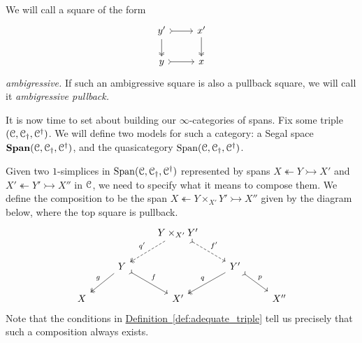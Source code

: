 \documentclass[main.tex]{subfiles}
\begin{document}
We will call a square of the form
\begin{equation*}
  \begin{tikzcd}
    y'
    \arrow[r, rightarrowtail]
    \arrow[d, two heads]
    & x'
    \arrow[d, two heads]
    \\
    y
    \arrow[r, rightarrowtail]
    & x
  \end{tikzcd}
\end{equation*}
\emph{ambigressive.} If such an ambigressive square is also a pullback square, we will call it \emph{ambigressive pullback.}

It is now time to set about building our $\infty$-categories of spans. Fix some triple $(\mathcal{C}, \mathcal{C}_{\dagger}, \mathcal{C}^{\dagger})$. We will define two models for such a category: a Segal space $\mathbf{Span}(\mathcal{C}, \mathcal{C}_{\dagger}, \mathcal{C}^{\dagger})$, and the quasicategory $\mathrm{Span}(\mathcal{C}, \mathcal{C}_{\dagger}, \mathcal{C}^{\dagger})$.

Given two $1$-simplices in $\mathrm{Span}(\mathcal{C}, \mathcal{C}_{\dagger}, \mathcal{C}^{\dagger})$ represented by spans $X \twoheadleftarrow Y \rightarrowtail X'$ and $X' \twoheadleftarrow Y' \rightarrowtail X''$ in $\mathcal{C}$, we need to specify what it means to compose them. We define the composition to be the span $X \twoheadleftarrow Y \times_{X'} Y' \rightarrowtail X''$ given by the diagram below, where the top square is pullback.
\begin{equation*}
  \begin{tikzcd}
    && Y \times_{X'} Y'
    \arrow[dl, two heads, dashed, swap, "q'"]
    \arrow[dr, tail, dashed, "f'"]
    \\
    & Y
    \arrow[dl, two heads, swap, "g"]
    \arrow[dr, tail, "f"]
    && Y'
    \arrow[dl, two heads, swap, "q"]
    \arrow[dr, tail, "p"]
    \\
    X
    && X'
    && X''
  \end{tikzcd}
\end{equation*}
Note that the conditions in \hyperref[def:adequate_triple]{Definition~\ref*{def:adequate_triple}} tell us precisely that such a composition always exists.
\end{document}
